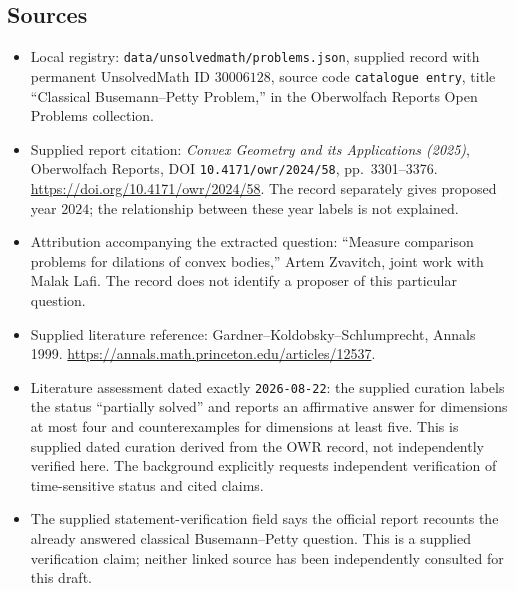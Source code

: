 \documentclass[11pt]{article}
\begin{document}
\subsection{Sources}
\begin{itemize}
\item Local registry: \texttt{data/unsolvedmath/problems.json}, supplied record with permanent UnsolvedMath ID \(30006128\), source code \texttt{catalogue entry}, title ``Classical Busemann--Petty Problem,'' in the Oberwolfach Reports Open Problems collection.
\item Supplied report citation: \emph{Convex Geometry and its Applications (2025)}, Oberwolfach Reports, DOI \texttt{10.4171/owr/2024/58}, pp.~3301--3376. \url{https://doi.org/10.4171/owr/2024/58}. The record separately gives proposed year \(2024\); the relationship between these year labels is not explained.
\item Attribution accompanying the extracted question: ``Measure comparison problems for dilations of convex bodies,'' Artem Zvavitch, joint work with Malak Lafi. The record does not identify a proposer of this particular question.
\item Supplied literature reference: Gardner--Koldobsky--Schlumprecht, Annals 1999. \url{https://annals.math.princeton.edu/articles/12537}.
\item Literature assessment dated exactly \texttt{2026-08-22}: the supplied curation labels the status ``partially solved'' and reports an affirmative answer for dimensions at most four and counterexamples for dimensions at least five. This is supplied dated curation derived from the OWR record, not independently verified here. The background explicitly requests independent verification of time-sensitive status and cited claims.
\item The supplied statement-verification field says the official report recounts the already answered classical Busemann--Petty question. This is a supplied verification claim; neither linked source has been independently consulted for this draft.
\end{itemize}
\end{document}
